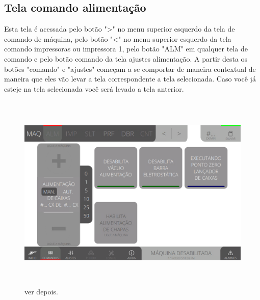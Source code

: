 \newpage
\thispagestyle{fancy}
\vspace*{\fill}
\subsection{Tela comando alimentação}
 Esta tela é acessada pelo botão "\textgreater" no menu superior esquerdo da tela de comando de máquina, pelo botão "\textless{}" no menu superior esquerdo da tela comando impressoras ou impressora 1, pelo botão "ALM" em qualquer tela de comando e pelo botão comando da tela ajustes alimentação. A partir desta os botões "comando" e "ajustes" começam a se comportar de maneira contextual de maneira que eles vão levar a tela correspondente a tela selecionada. Caso você já esteje na tela selecionada você será levado a tela anterior.
\begin{figure}[h]
  \centering
  \includegraphics[width=576px,height=360px]{src/images/03-feeder/commands/e-Tela-Principal.png}
  \caption{ver depois.}
   \label{}
\end{figure}

\newpage
\thispagestyle{fancy}
\vspace*{\fill}
